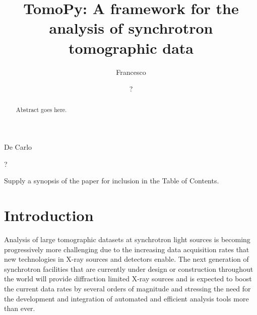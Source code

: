 \documentclass[pdf]{iucr}              %
\begin{document}



\title{TomoPy: A framework for the analysis of synchrotron tomographic data}


\author{Francesco}{De Carlo}
\author{?}{?}







\maketitle                        %

\begin{synopsis}
Supply a synopsis of the paper for inclusion in the Table of Contents.
\end{synopsis}

\begin{abstract}
Abstract goes here.
\end{abstract}


\section{Introduction}

Analysis of large tomographic datasets at synchrotron light sources is becoming progressively more challenging  due to the increasing data acquisition rates that new technologies in X-ray sources and detectors enable. The next generation of synchrotron facilities that are currently under design or construction throughout the world will provide diffraction limited X-ray sources and is expected to boost the current data rates by several orders of magnitude and stressing the need for the development and integration of automated and efficient analysis tools more than ever. 
\end{document}
